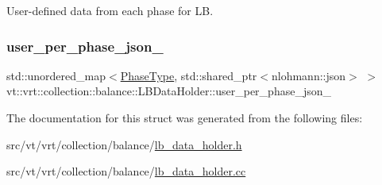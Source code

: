 User-\/defined data from each phase for LB. 

\mbox{\label{structvt_1_1vrt_1_1collection_1_1balance_1_1_l_b_data_holder_aa4b11a094d2f858d29e4a91d61942ddf}} 
\subsubsection{\texorpdfstring{user\+\_\+per\+\_\+phase\+\_\+json\+\_\+}{user\_per\_phase\_json\_}}
{\footnotesize\ttfamily std\+::unordered\+\_\+map$<$\hyperlink{namespacevt_a46ce6733d5cdbd735d561b7b4029f6d7}{Phase\+Type}, std\+::shared\+\_\+ptr$<$nlohmann\+::json$>$ $>$ vt\+::vrt\+::collection\+::balance\+::\+L\+B\+Data\+Holder\+::user\+\_\+per\+\_\+phase\+\_\+json\+\_\+}



The documentation for this struct was generated from the following files\+:\begin{DoxyCompactItemize}
\item 
src/vt/vrt/collection/balance/\hyperlink{lb__data__holder_8h}{lb\+\_\+data\+\_\+holder.\+h}\item 
src/vt/vrt/collection/balance/\hyperlink{lb__data__holder_8cc}{lb\+\_\+data\+\_\+holder.\+cc}\end{DoxyCompactItemize}
